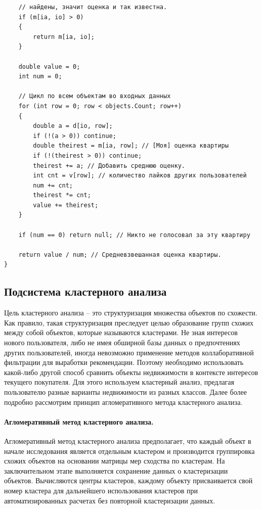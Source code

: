 \documentclass[a4paper,14pt,openany,final]{extreport} %
\begin{document}
{\begin{verbatim}
    // найдены, значит оценка и так известна.
    if (m[ia, io] > 0)
    {
        return m[ia, io];
    }

    double value = 0;
    int num = 0;

    // Цикл по всем объектам во входных данных
    for (int row = 0; row < objects.Count; row++)
    {
        double a = d[io, row];
        if (!(a > 0)) continue;
        double theirest = m[ia, row]; // [Моя] оценка квартиры
        if (!(theirest > 0)) continue;
        theirest += a; // Добавить среднюю оценку.
        int cnt = v[row]; // количество лайков других пользователей
        num += cnt;
        theirest *= cnt;
        value += theirest;
    }

    if (num == 0) return null; // Никто не голосовал за эту квартиру

    return value / num; // Средневзвешанная оценка квартиры.
}
\end{verbatim}

\subsection{Подсистема кластерного анализа}

Цель кластерного анализа -- это структуризация множества объектов по схожести. Как правило, такая структуризация преследует целью образование групп схожих между собой объектов, которые называются кластерами. Не зная интересов нового пользователя, либо не имея обширной базы данных о предпочтениях других пользователей, иногда невозможно применение методов коллаборативной фильтрации для выработки рекомендации. Поэтому необходимо использовать какой-либо другой способ сравнить объекты недвижимости в контексте интересов текущего покупателя. Для этого используем кластерный анализ, предлагая пользователю разные варианты недвижимости из разных классов. Далее более подробно рассмотрим принцип агломеративного метода кластерного анализа.

\paragraph{Агломеративный метод кластерного анализа.}
Агломеративный метод кластерного анализа предполагает, что каждый объект в начале исследования является отдельным кластером и производится группировка схожих объектов на основании матрицы мер сходства по кластерам. На заключительном этапе выполняется сохранение данных о кластеризации объектов. Вычисляются центры кластеров, каждому объекту присваивается свой номер кластера для дальнейшего использования кластеров при автоматизированных расчетах без повторной кластеризации данных.

}
\end{document}
